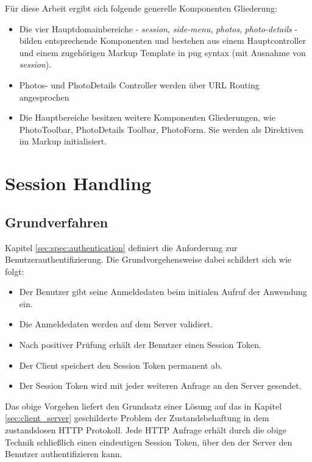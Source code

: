 Für diese Arbeit ergibt sich folgende generelle Komponenten Gliederung:

\begin{itemize}
\item Die vier Hauptdomainbereiche - \textit{session}, \textit{side-menu}, \textit{photos}, \textit{photo-details} - bilden entsprechende Komponenten und bestehen aus einem Hauptcontroller und einem zugehörigen Markup Template in \gls{pug} syntax (mit Ausnahme von \textit{session}). 
\item Photos- und PhotoDetails Controller werden über URL Routing angesprochen
\item Die Hauptbereiche besitzen weitere Komponenten Gliederungen, wie PhotoToolbar, PhotoDetails Toolbar, PhotoForm. Sie werden als Direktiven im Markup initialisiert.
\end{itemize}

\section{Session Handling}

\subsection{Grundverfahren}
\label{sec:session_handling_basics}

Kapitel \ref{sec:spec:authentication} definiert die Anforderung zur Benutzerauthentifizierung. Die Grundvorgehensweise dabei schildert sich wie folgt:

\begin{itemize}
  \item Der Benutzer gibt seine Anmeldedaten beim initialen Aufruf der Anwendung ein.
  \item Die Anmeldedaten werden auf dem Server validiert.
  \item Nach positiver Prüfung erhält der Benutzer einen Session Token.
  \item Der Client speichert den Session Token permanent ab.
  \item Der Session Token wird mit jeder weiteren Anfrage an den Server gesendet. 
\end{itemize}

Das obige Vorgehen liefert den Grundsatz einer Lösung auf das in Kapitel \ref{sec:client_server} geschilderte Problem der Zustandsbehaftung in dem zustandslosen HTTP Protokoll. Jede HTTP Anfrage erhält durch die obige Technik schließlich einen eindeutigen Session Token, über den der Server den Benutzer authentifizieren kann. 

